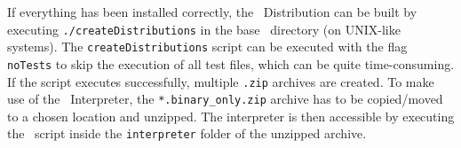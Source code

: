 If everything has been installed correctly, the \setlx\ Distribution can be built by executing \lstinline{./createDistributions} in the base \setlx\ directory (on UNIX-like systems). The \lstinline{createDistributions} script can be executed with the flag \lstinline{noTests} to skip the execution of all test files, which can be quite time-consuming. If the script executes successfully, multiple \lstinline{.zip} archives are created. To make use of the \setlx\ Interpreter, the \lstinline{*.binary_only.zip} archive has to be copied/moved to a chosen location and unzipped. The interpreter is then accessible by executing the \setlx\ script inside the \lstinline{interpreter} folder of the unzipped archive.